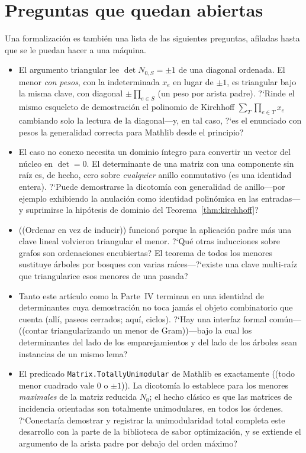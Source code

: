 \documentclass[11pt]{article}
\newcommand{\lean}[1]{\texttt{#1}}
\begin{document}
\section{Preguntas que quedan abiertas}
\label{sec:questions}

Una formalizaci\'on es tambi\'en una lista de las siguientes preguntas, afiladas hasta que se
le puedan hacer a una m\'aquina.

\begin{itemize}
\item El argumento triangular lee $\det N_{0,S}=\pm1$ de una diagonal ordenada. El menor
\emph{con pesos}, con la indeterminada $x_e$ en lugar de $\pm1$, es triangular bajo la misma
clave, con diagonal $\pm\prod_{e\in S}$\,(un peso por arista padre). ?`Rinde el mismo esqueleto
de demostraci\'on el polinomio de Kirchhoff $\sum_T\prod_{e\in T}x_e$ cambiando solo la lectura
de la diagonal---y, en tal caso, ?`es el enunciado con pesos la generalidad correcta para
Mathlib desde el principio?
\item El caso no conexo necesita un dominio \'integro para convertir un vector del n\'ucleo en
$\det=0$. El determinante de una matriz con una componente sin ra\'iz es, de hecho, cero sobre
\emph{cualquier} anillo conmutativo (es una identidad entera). ?`Puede demostrarse la
dicotom\'ia con generalidad de anillo---por ejemplo exhibiendo la anulaci\'on como identidad
polin\'omica en las entradas---y suprimirse la hip\'otesis de dominio del
Teorema~\ref{thm:kirchhoff}?
\item ((Ordenar en vez de inducir)) funcion\'o porque la aplicaci\'on padre m\'as una clave
lineal volvieron triangular el menor. ?`Qu\'e otras inducciones sobre grafos son ordenaciones
encubiertas? El teorema de todos los menores~\cite{ChaikenKleitman1978} sustituye \'arboles por
bosques con varias ra\'ices---?`existe una clave multi-ra\'iz que triangularice esos menores de
una pasada?
\item Tanto este art\'iculo como la Parte~IV terminan en una identidad de determinantes cuya
demostraci\'on no toca jam\'as el objeto combinatorio que cuenta (all\'i, paseos cerrados;
aqu\'i, ciclos). ?`Hay una interfaz formal com\'un---((contar triangularizando un menor de
Gram))---bajo la cual los determinantes del lado de los emparejamientos y del lado de los
\'arboles sean instancias de un mismo lema?
\item El predicado \lean{Matrix.TotallyUnimodular} de Mathlib es exactamente ((todo menor
cuadrado vale $0$ o $\pm1$)). La dicotom\'ia lo establece para los menores \emph{maximales} de
la matriz reducida $N_0$; el hecho cl\'asico es que las matrices de incidencia orientadas son
totalmente unimodulares, en todos los \'ordenes. ?`Conectar\'ia demostrar y registrar la
unimodularidad total completa este desarrollo con la parte de la biblioteca de sabor
optimizaci\'on, y se extiende el argumento de la arista padre por debajo del orden m\'aximo?
\end{itemize}
\end{document}
